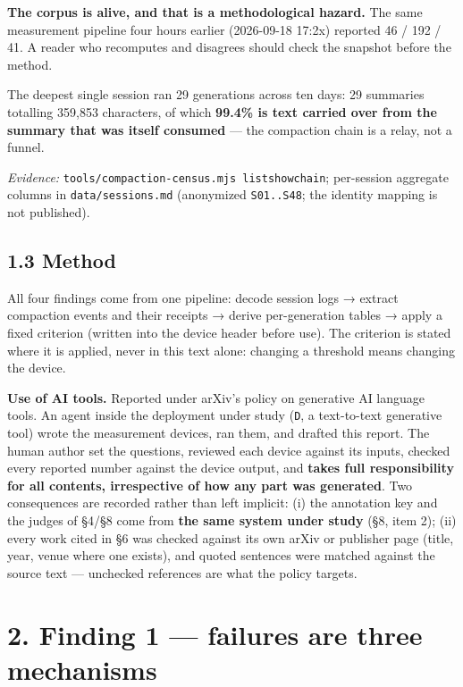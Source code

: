 \documentclass[
]{article}
\begin{document}
\textbf{The corpus is alive, and that is a methodological hazard.} The
same measurement pipeline four hours earlier (2026-09-18 17:2x) reported
46 / 192 / 41. A reader who recomputes and disagrees should check the
snapshot before the method.

The deepest single session ran 29 generations across ten days: 29
summaries totalling 359,853 characters, of which \textbf{99.4\% is text
carried over from the summary that was itself consumed} --- the
compaction chain is a relay, not a funnel.

\emph{Evidence:}
\texttt{tools/compaction-census.mjs\ list\textbar{}show\textbar{}chain};
per-session aggregate columns in \texttt{data/sessions.md} (anonymized
\texttt{S01..S48}; the identity mapping is not published).

\subsection{1.3 Method}\label{method}

All four findings come from one pipeline: decode session logs → extract
compaction events and their receipts → derive per-generation tables →
apply a fixed criterion (written into the device header before use). The
criterion is stated where it is applied, never in this text alone:
changing a threshold means changing the device.

\textbf{Use of AI tools.} Reported under arXiv's policy on generative AI
language tools. An agent inside the deployment under study (\texttt{D},
a text-to-text generative tool) wrote the measurement devices, ran them,
and drafted this report. The human author set the questions, reviewed
each device against its inputs, checked every reported number against
the device output, and \textbf{takes full responsibility for all
contents, irrespective of how any part was generated}. Two consequences
are recorded rather than left implicit: (i) the annotation key and the
judges of §4/§8 come from \textbf{the same system under study} (§8, item
2); (ii) every work cited in §6 was checked against its own arXiv or
publisher page (title, year, venue where one exists), and quoted
sentences were matched against the source text --- unchecked references
are what the policy targets.

\section{2. Finding 1 --- failures are three
mechanisms}\label{finding-1-failures-are-three-mechanisms}
\end{document}
